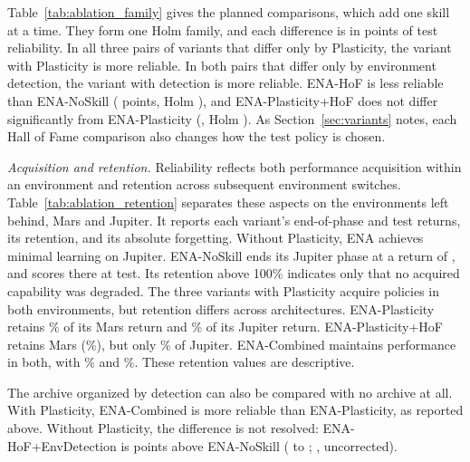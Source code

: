 Table~\ref{tab:ablation_family} gives the  planned comparisons, which add one skill at a time. They form one Holm family, and each difference is in points of test reliability. In all three pairs of variants that differ only by Plasticity, the variant with Plasticity is more reliable. In both pairs that differ only by environment detection, the variant with detection is more reliable. ENA-HoF is less reliable than ENA-NoSkill ( points, Holm ), and ENA-Plasticity+HoF does not differ significantly from ENA-Plasticity (, Holm ). As Section~\ref{sec:variants} notes, each Hall of Fame comparison also changes how the test policy is chosen.

\textit{Acquisition and retention.} Reliability reflects both performance acquisition within an environment and retention across subsequent environment switches. Table~\ref{tab:ablation_retention} separates these aspects on the environments left behind, Mars and Jupiter. It reports each variant's end-of-phase and test returns, its retention, and its absolute forgetting. Without Plasticity, ENA achieves minimal learning on Jupiter. ENA-NoSkill ends its Jupiter phase at a return of , and scores  there at test. Its retention above 100\% indicates only that no acquired capability was degraded. The three variants with Plasticity acquire policies in both environments, but retention differs across architectures. ENA-Plasticity retains \% of its Mars return and \% of its Jupiter return. ENA-Plasticity+HoF retains Mars (\%), but only \% of Jupiter. ENA-Combined maintains performance in both, with \% and \%. These retention values are descriptive.

The archive organized by detection can also be compared with no archive at all. With Plasticity, ENA-Combined is more reliable than ENA-Plasticity, as reported above. Without Plasticity, the difference is not resolved: ENA-HoF+EnvDetection is  points above ENA-NoSkill ( to ; , uncorrected).

